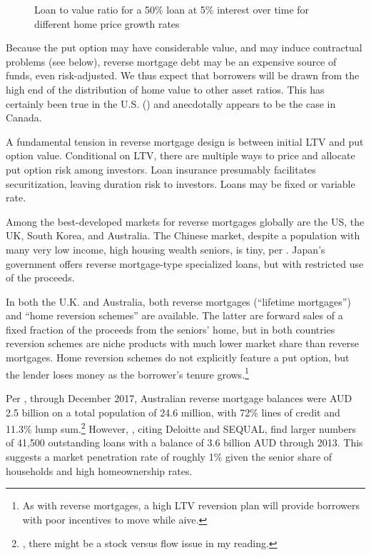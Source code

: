 \documentclass[12pt]{article}
\begin{document}
\begin{figure}
	\caption{\label{fig:ltv} Loan to value ratio for a 50\% loan at 5\% interest over time for different home price growth rates}
\end{figure}

Because the put option may have considerable value, and may induce contractual
problems (see below), reverse mortgage debt may be an expensive source of
funds, even risk-adjusted. We thus expect that borrowers will be drawn from the
high end of the distribution of home value to other asset ratios. This has
certainly been true in the U.S. (\textcite{Davidoffhecmdemographics}) and
anecdotally appears to be the case in Canada.

A fundamental tension in reverse mortgage design is between initial LTV and put
option value. Conditional on LTV, there are multiple ways to price and allocate
put option risk among investors. Loan insurance presumably facilitates
securitization, leaving duration risk to investors. Loans may be fixed or
variable rate.

Among the best-developed markets for reverse mortgages globally are the US, the
UK, South Korea, and Australia. The Chinese market, despite a population with
many very low income, high housing wealth seniors, is tiny, per
\textcite{HanewaldBatemanFangWu}. Japan's government offers reverse
mortgage-type specialized loans, but with restricted use of the proceeds.

In both the U.K. and Australia, both reverse mortgages (``lifetime mortgages'')
and ``home reversion schemes'' are available. The latter are forward sales of a
fixed fraction of the proceeds from the seniors' home, but in both countries
reversion schemes are niche products with much lower market share than reverse
mortgages. Home reversion schemes do not explicitly feature a put option, but
the lender loses money as the borrower's tenure grows.\footnote{As with reverse
mortgages, a high LTV reversion plan will provide borrowers with poor
incentives to move while aive.}

Per \textcite{ASIC}, through December 2017, Australian reverse mortgage
balances were AUD 2.5 billion on a total population of 24.6 million, with 72\%
lines of credit and 11.3\% lump sum.\footnote{\textcite{ASIC}, there might be a
stock versus flow issue in my reading.} However, \textcite{Kobayashietal},
citing Deloitte and SEQUAL, find larger numbers of 41,500 outstanding loans
with a balance of 3.6 billion AUD through 2013. This suggests a market
penetration rate of roughly 1\% given the senior share of households and high
homeownership rates.
\end{document}
